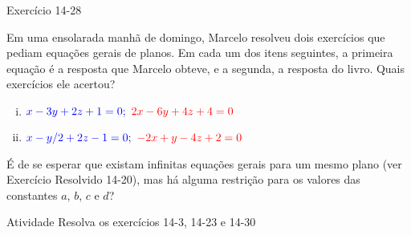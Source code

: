 \begin{frame}{Exercício 14-28}
    \begin{minipage}{\textwidth}
        Em uma ensolarada manhã de domingo, Marcelo resolveu dois exercícios que
        pediam equações gerais de planos. Em cada um dos itens seguintes, a primeira equação
        é a resposta que Marcelo obteve, e a segunda, a resposta do livro. Quais exercícios
        ele acertou?
    \end{minipage}
    \begin{enumerate}[(i)]
        \item \(\color{blue} x-3y+2z+1=0; ~ \color{red} 2x-6y+4z+4=0\)
        \item \(\color{blue} x-y/2+2z-1=0; ~ \color{red} -2x+y-4z+2=0\)
    \end{enumerate}

    \vspace {1.5cm}
    \pause

    \begin{tcolorbox}[colback=magenta!25]
    É de se esperar que existam infinitas equações gerais para um mesmo plano (ver Exercício Resolvido 14-20),
    mas há alguma restrição para os valores das constantes \(a\), \(b\), \(c\) e \(d\)?

    \end{tcolorbox}

\end{frame}

\begin{frame}{Atividade}
    Resolva os exercícios 14-3, 14-23 e 14-30
\end{frame}
